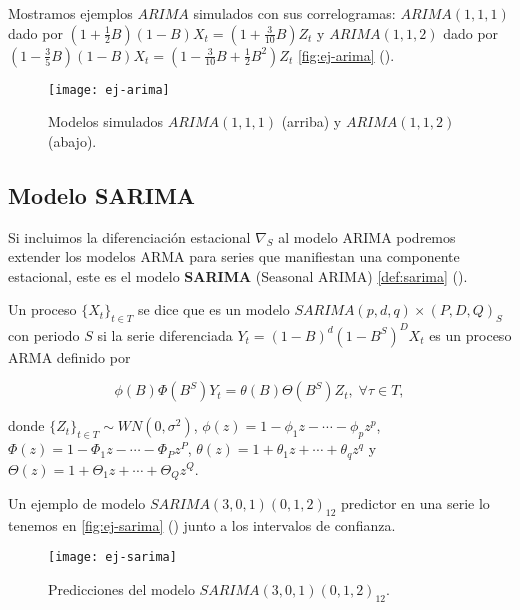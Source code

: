 Mostramos ejemplos $ARIMA$ simulados con sus correlogramas: $ARIMA(1, 1, 1)$ dado por $(1 + \frac{1}{2}B)(1-B)X_t = (1+\frac{3}{10}B)Z_t$ y $ARIMA(1, 1, 2)$ dado por $(1 - \frac{3}{5}B)(1-B)X_t = (1-\frac{3}{10}B+\frac{1}{2}B^2)Z_t$ \autoref{fig:ej-arima} (\cite{chatfield2019analysis}).

\begin{figure}[htpb]
  \centering
  \texttt{[image: ej-arima]}
  \caption{Modelos simulados $ARIMA(1, 1, 1)$ (arriba) y $ARIMA(1, 1, 2)$ (abajo).}
  \label{fig:ej-arima}
\end{figure}

\subsection{Modelo SARIMA}

Si incluimos la diferenciación estacional $\nabla_S$ al modelo ARIMA podremos extender los modelos ARMA para series que manifiestan una componente estacional, este es el modelo \textbf{SARIMA} (Seasonal ARIMA) \autoref{def:sarima} (\cite{box2011time}).

\begin{definicion}
  Un proceso $\{X_t\}_{t \in T}$ se dice que es un modelo $SARIMA(p,d,q)\times(P,D,Q)_S$ con periodo $S$ si la serie diferenciada $Y_t = (1 - B)^d(1 - B^S)^D X_t$ es un proceso ARMA definido por

  $$\phi(B)\Phi(B^S)Y_t = \theta(B)\Theta(B^S)Z_t, \; \forall \tau \in T,$$

  donde $\{Z_t\}_{t \in T} \sim WN(0, \sigma^2)$, $\phi(z) = 1 - \phi_1 z - \cdots - \phi_p z^p$, $\Phi(z) = 1 - \Phi_1z - \cdots - \Phi_P z^P$, $\theta(z) = 1 + \theta_1 z + \cdots + \theta_qz^q$ y $\Theta(z) = 1 + \Theta_1z + \cdots + \Theta_Q z^Q$.
\label{def:sarima}
\end{definicion}

Un ejemplo de modelo $SARIMA(3, 0, 1)(0, 1, 2)_12$ predictor en una serie lo tenemos en \autoref{fig:ej-sarima} (\cite{hyndman2018forecasting}) junto a los intervalos de confianza.

\begin{figure}[htpb]
  \centering
  \texttt{[image: ej-sarima]}
  \caption{Predicciones del modelo $SARIMA(3, 0, 1)(0, 1, 2)_12$.}
  \label{fig:ej-sarima}
\end{figure}


\endinput
